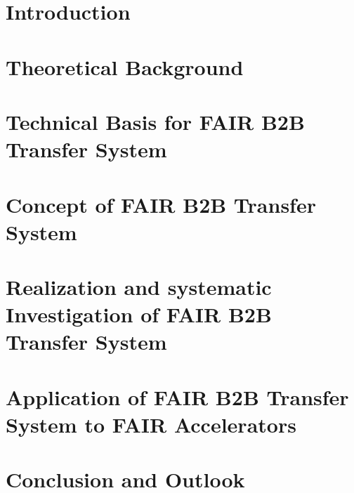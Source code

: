\documentclass[12pt,twoside]{report}
\begin{document}



\chapter{Introduction}

\chapter{Theoretical Background}\label{background}

%
\chapter{Technical Basis for FAIR B2B Transfer System}\label{technical}

\chapter{Concept of FAIR B2B Transfer System}\label{concept}

\chapter{Realization and systematic Investigation of FAIR B2B Transfer System}\label{realization}

\chapter{Application of FAIR B2B Transfer System to FAIR Accelerators}\label{application}

%
\chapter{Conclusion and Outlook}

\end{document}
